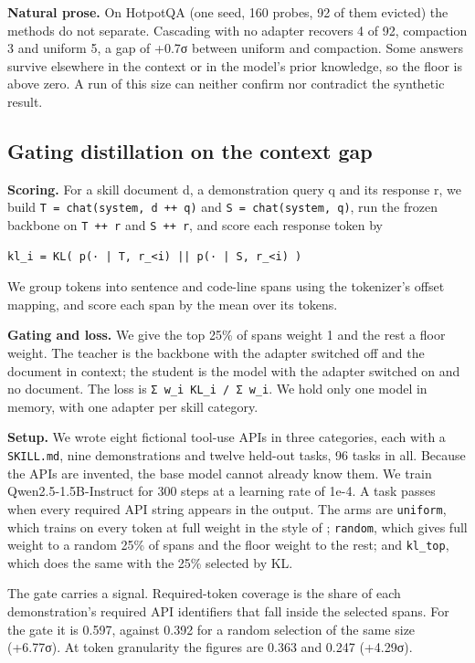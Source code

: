 \documentclass[10pt]{article}
\begin{document}
\textbf{Natural prose.} On HotpotQA (one seed, 160 probes, 92 of them evicted) the methods do not
separate. Cascading with no adapter recovers 4 of 92, compaction 3 and uniform 5, a gap of
+0.7σ between uniform and compaction. Some answers survive elsewhere in the context or in the
model's prior knowledge, so the floor is above zero. A run of this size can neither confirm
nor contradict the synthetic result.

\subsection{Gating distillation on the context gap}

\textbf{Scoring.} For a skill document d, a demonstration query q and its response r, we build
\texttt{T\ =\ chat(system,\ d\ ++\ q)} and \texttt{S\ =\ chat(system,\ q)}, run the frozen backbone on \texttt{T\ ++\ r} and
\texttt{S\ ++\ r}, and score each response token by

\begin{verbatim}
kl_i = KL( p(· | T, r_<i) || p(· | S, r_<i) )
\end{verbatim}

We group tokens into sentence and code-line spans using the tokenizer's offset mapping,
and score each span by the mean over its tokens.

\textbf{Gating and loss.} We give the top 25\% of spans weight 1 and the rest a floor weight. The
teacher is the backbone with the adapter switched off and the document in context; the
student is the model with the adapter switched on and no document. The loss is
\texttt{Σ\ w\_i\ KL\_i\ /\ Σ\ w\_i}. We hold only one model in memory, with one adapter per skill category.

\textbf{Setup.} We wrote eight fictional tool-use APIs in three categories, each with a
\texttt{SKILL.md}, nine demonstrations and twelve held-out tasks, 96 tasks in all. Because the APIs
are invented, the base model cannot already know them. We train Qwen2.5-1.5B-Instruct for 300
steps at a learning rate of 1e-4. A task passes when every required API string appears in the
output. The arms are \texttt{uniform}, which trains on every token at full weight in the style of
\citet{zhang2026skill}; \texttt{random}, which gives full weight to a random 25\% of spans and the floor weight to the
rest; and \texttt{kl\_top}, which does the same with the 25\% selected by KL.

The gate carries a signal. Required-token coverage is the share of each demonstration's
required API identifiers that fall inside the selected spans. For the gate it is 0.597,
against 0.392 for a random selection of the same size (+6.77σ). At token granularity the
figures are 0.363 and 0.247 (+4.29σ).
\end{document}
